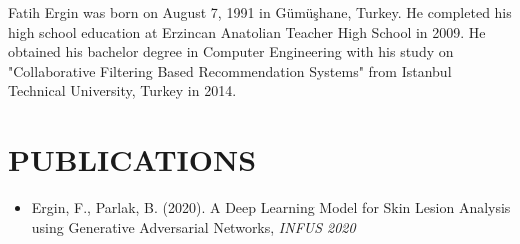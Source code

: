 \curriculumvitae
\label{chapter:vita}

Fatih Ergin was born on August 7, 1991 in Gümüşhane, Turkey.
He completed his high school education at Erzincan Anatolian Teacher High School in 2009.
He obtained his bachelor degree in Computer Engineering with his study on
"Collaborative Filtering Based Recommendation Systems" from Istanbul Technical University, Turkey in 2014.


\section*{\uppercase{Publications}}

    \begin{itemize}
        \item[] Ergin, F., Parlak, B. (2020). A Deep Learning Model for Skin Lesion Analysis using Generative Adversarial Networks, \emph{INFUS 2020}
    \end{itemize}